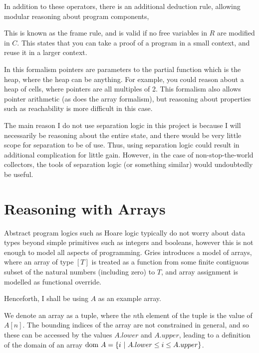 In addition to these operators, there is an additional deduction rule,
allowing modular reasoning about program components,

\begin{prooftree}
\end{prooftree}

This is known as the frame rule, and is valid if no free variables in
$R$ are modified in $C$. This states that you can take a proof of a
program in a small context, and reuse it in a larger context.

In this formalism pointers are parameters to the partial function
which is the heap, where the heap can be anything. For example, you
could reason about a heap of cells, where pointers are all multiples
of 2. This formalism also allows pointer arithmetic (as does the array
formalism), but reasoning about properties such as reachability is
more difficult in this case.

The main reason I do not use separation logic in this project is
because I will necessarily be reasoning about the entire state, and
there would be very little scope for separation to be of use. Thus,
using separation logic could result in additional complication for
little gain. However, in the case of non-stop-the-world collectors,
the tools of separation logic (or something similar) would undoubtedly
be useful.

\section{Reasoning with Arrays}
\label{sec:heap-arrays}

Abstract program logics such as Hoare logic typically do not worry
about data types beyond simple primitives such as integers and
booleans, however this is not enough to model all aspects of
programming. Gries introduces a model of arrays\cite{Gries87}, where
an array of type $[T]$ is treated as a function from some finite
contiguous subset of the natural numbers (including zero) to $T$, and
array assignment is modelled as functional override.

Henceforth, I shall be using $A$ as an example array.

We denote an array as a tuple, where the $n$th element of the tuple is
the value of $A[n]$. The bounding indices of the array are not
constrained in general, and so these can be accessed by the values
$A.lower$ and $A.upper$, leading to a definition of the domain of an
array $\dom~A = \{i~|~A.lower \leq i \leq A.upper\}$.

